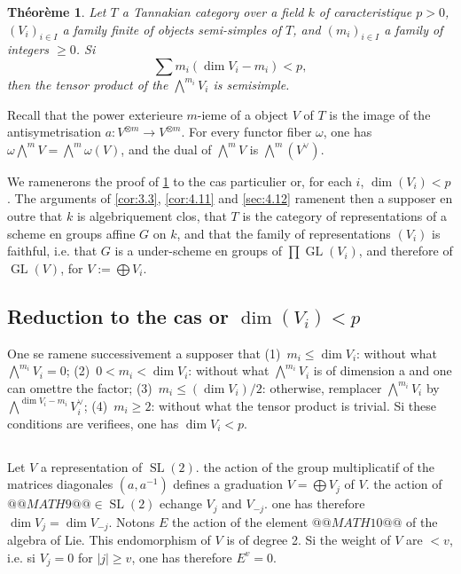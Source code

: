 \documentclass[11pt,a4paper]{article}
\theoremstyle{plain}
\newtheorem{theorem}{Th\'eor\`eme}[section]
\theoremstyle{definition}
\DeclareMathOperator{\GL}{GL}
\DeclareMathOperator{\SL}{SL}
\begin{document}
\begin{theorem}\label{thm:5.1}
Let $T$ a Tannakian category over a field $k$ of caracteristique $p > 0$, $(V_i)_{i \in I}$ a family finite of objects semi-simples of $T$, and $(m_i)_{i \in I}$ a family of integers $\geq 0$. Si
\begin{equation}\label{eq:5.1.1}
\sum m_i(\dim V_i - m_i) < p,
\end{equation}
then the tensor product of the $\bigwedge^{m_i} V_i$ is semisimple.
\end{theorem}

Recall that the power exterieure $m$-ieme of a object $V$ of $T$ is the image of the antisymetrisation $a: V^{\otimes m} \to V^{\otimes m}$. For every functor fiber $\omega$, one has $\omega \bigwedge^m V = \bigwedge^m \omega(V)$, and the dual of $\bigwedge^m V$ is $\bigwedge^m (V^\vee)$.

We ramenerons the proof of \ref{thm:5.1} to the cas particulier or, for each $i$, $\dim(V_i) < p$. The arguments of \ref{cor:3.3}, \ref{cor:4.11} and \ref{sec:4.12} ramenent then a supposer en outre that $k$ is algebriquement clos, that $T$ is the category of representations of a scheme en groups affine $G$ on $k$, and that the family of representations $(V_i)$ is faithful, i.e. that $G$ is a under-scheme en groups of $\prod \GL(V_i)$, and therefore of $\GL(V)$, for $V := \bigoplus V_i$.

\subsection{Reduction to the cas or $\dim(V_i) < p$}\label{sec:5.2}

One se ramene successivement a supposer that (1)~$m_i \leq \dim V_i$: without what $\bigwedge^{m_i} V_i = 0$; (2)~$0 < m_i < \dim V_i$: without what $\bigwedge^{m_i} V_i$ is of dimension a and one can omettre the factor; (3)~$m_i \leq (\dim V_i)/2$: otherwise, remplacer $\bigwedge^{m_i} V_i$ by $\bigwedge^{\dim V_i - m_i} V_i^\vee$; (4)~$m_i \geq 2$: without what the tensor product is trivial. Si these conditions are verifiees, one has $\dim V_i < p$.

\subsection{}
Let $V$ a representation of $\SL(2)$. the action of the group multiplicatif of the matrices diagonales $(a, a^{-1})$ defines a graduation $V = \bigoplus V_j$ of $V$. the action of $@@MATH9@@ \in \SL(2)$ echange $V_j$ and $V_{-j}$. one has therefore $\dim V_j = \dim V_{-j}$. Notons $E$ the action of the element $@@MATH10@@$ of the algebra of Lie. This endomorphism of $V$ is of degree 2. Si the weight of $V$ are $< v$, i.e. si $V_j = 0$ for $|j| \geq v$, one has therefore $E^v = 0$.
\end{document}
